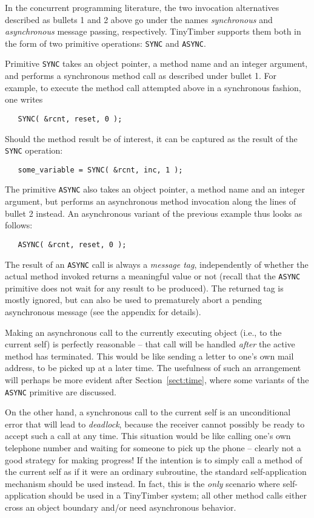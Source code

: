 \documentclass[12pt]{article}
\begin{document}
In the concurrent programming literature, the two invocation alternatives described as bullets 1 and 2 above go under the names {\em synchronous} and {\em asynchronous} message passing, respectively.  TinyTimber supports them both in the form of two primitive operations: {\tt SYNC} and {\tt ASYNC}.

Primitive {\tt SYNC} takes an object pointer, a method name and an integer argument, and performs a synchronous method call as described under bullet 1.  For example, to execute the method call attempted above in a synchronous fashion, one writes
\begin{verbatim}
   SYNC( &rcnt, reset, 0 );
\end{verbatim}
Should the method result be of interest, it can be captured as the result of the {\tt SYNC} operation:
\begin{verbatim}
   some_variable = SYNC( &rcnt, inc, 1 );
\end{verbatim}

The primitive {\tt ASYNC} also takes an object pointer, a method name and an integer argument, but performs an asynchronous method invocation along the lines of bullet 2 instead.  An asynchronous variant of the previous example thus looks as follows:
\begin{verbatim}
   ASYNC( &rcnt, reset, 0 );
\end{verbatim}
The result of an {\tt ASYNC} call is always a {\em message tag}, independently of whether the actual method invoked returns a meaningful value or not (recall that the {\tt ASYNC} primitive does not wait for any result to be produced).  The returned tag is mostly ignored, but can also be used to prematurely abort a pending asynchronous message (see the appendix for details).

Making an asynchronous call to the currently executing object (i.e., to the current self) is perfectly reasonable -- that call will be handled {\em after} the active method has terminated.  This would be like sending a letter to one's own mail address, to be picked up at a later time.  The usefulness of such an arrangement will perhaps be more evident after Section~\ref{sect:time}, where some variants of the {\tt ASYNC} primitive are discussed.

On the other hand, a synchronous call to the current self is an unconditional error that will lead to {\em deadlock}, because the receiver cannot possibly be ready to accept such a call at any time.  This situation would be like calling one's own telephone number and waiting for someone to pick up the phone -- clearly not a good strategy for making progress!  If the intention is to simply call a method of the current self as if it were an ordinary subroutine, the standard self-application mechanism should be used instead.  In fact, this is the {\em only} scenario where self-application should be used in a TinyTimber system; all other method calls either cross an object boundary and/or need asynchronous behavior.
\end{document}
